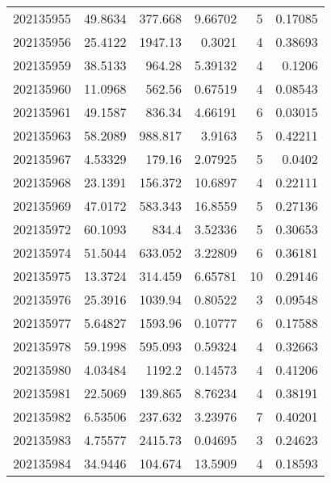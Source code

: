 \begin{tabular}{rrrrrr}
 202135955 &         49.8634  &      377.668  &            9.66702 &           5 & 0.17085 \\
 202135956 &         25.4122  &     1947.13   &            0.3021  &           4 & 0.38693 \\
 202135959 &         38.5133  &      964.28   &            5.39132 &           4 & 0.1206  \\
 202135960 &         11.0968  &      562.56   &            0.67519 &           4 & 0.08543 \\
 202135961 &         49.1587  &      836.34   &            4.66191 &           6 & 0.03015 \\
 202135963 &         58.2089  &      988.817  &            3.9163  &           5 & 0.42211 \\
 202135967 &          4.53329 &      179.16   &            2.07925 &           5 & 0.0402  \\
 202135968 &         23.1391  &      156.372  &           10.6897  &           4 & 0.22111 \\
 202135969 &         47.0172  &      583.343  &           16.8559  &           5 & 0.27136 \\
 202135972 &         60.1093  &      834.4    &            3.52336 &           5 & 0.30653 \\
 202135974 &         51.5044  &      633.052  &            3.22809 &           6 & 0.36181 \\
 202135975 &         13.3724  &      314.459  &            6.65781 &          10 & 0.29146 \\
 202135976 &         25.3916  &     1039.94   &            0.80522 &           3 & 0.09548 \\
 202135977 &          5.64827 &     1593.96   &            0.10777 &           6 & 0.17588 \\
 202135978 &         59.1998  &      595.093  &            0.59324 &           4 & 0.32663 \\
 202135980 &          4.03484 &     1192.2    &            0.14573 &           4 & 0.41206 \\
 202135981 &         22.5069  &      139.865  &            8.76234 &           4 & 0.38191 \\
 202135982 &          6.53506 &      237.632  &            3.23976 &           7 & 0.40201 \\
 202135983 &          4.75577 &     2415.73   &            0.04695 &           3 & 0.24623 \\
 202135984 &         34.9446  &      104.674  &           13.5909  &           4 & 0.18593 \\

\end{tabular}
